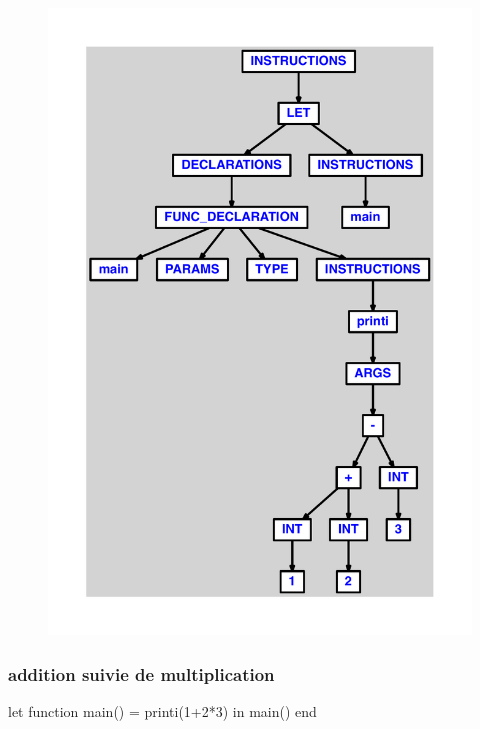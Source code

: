 \documentclass{article}
\begin{document}
\begin{figure}[H]\centering\includegraphics[max width=\textwidth]{ast/ast_44.pdf}\end{figure}\subsubsection{addition suivie de multiplication}
\begin{verbatimtab}
let
	function main() = printi(1+2*3)
in main() end
\end{verbatimtab}
\end{document}
